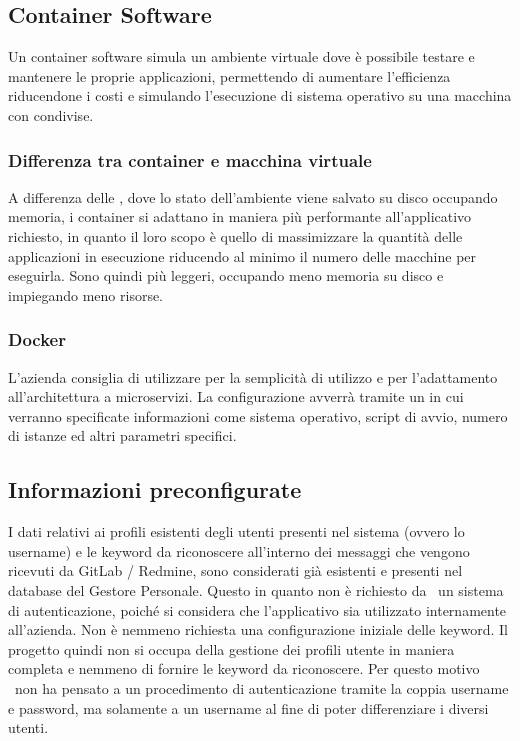 	\subsection{Container Software}
	
	Un container software simula un ambiente virtuale dove è possibile testare e mantenere le proprie applicazioni, permettendo di aumentare l'efficienza riducendone i costi e simulando l'esecuzione di sistema operativo su una macchina con  condivise.
		
		\subsubsection{Differenza tra container e macchina virtuale}
		A differenza delle , dove lo stato dell'ambiente viene salvato su disco occupando memoria, i container si adattano in maniera più performante all'applicativo richiesto, in quanto il loro scopo è quello di massimizzare la quantità delle applicazioni in esecuzione riducendo al minimo il numero delle macchine per eseguirla.
		Sono quindi più leggeri, occupando meno memoria su disco e impiegando meno risorse.
		
		\subsubsection{Docker}
		L'azienda consiglia di utilizzare  per la semplicità di utilizzo e per l'adattamento all'architettura a microservizi.
		La configurazione avverrà tramite un  in cui verranno specificate informazioni come sistema operativo, script di avvio, numero di istanze ed altri parametri specifici.

	\subsection{Informazioni preconfigurate}
	I dati relativi ai profili esistenti degli utenti presenti nel sistema (ovvero lo username) e le keyword da riconoscere all'interno dei messaggi che vengono ricevuti da GitLab / Redmine, sono considerati già esistenti e presenti nel database del Gestore Personale.
	Questo in quanto non è richiesto da \II\ un sistema di autenticazione, poiché si considera che l'applicativo sia utilizzato internamente all'azienda.
	Non è nemmeno richiesta una configurazione iniziale delle keyword.
	Il progetto quindi non si occupa della gestione dei profili utente in maniera completa e nemmeno di fornire le keyword da riconoscere.
	Per questo motivo \gruppo\ non ha pensato a un procedimento di autenticazione tramite la coppia username e password, ma solamente a un username al fine di poter differenziare i diversi utenti.